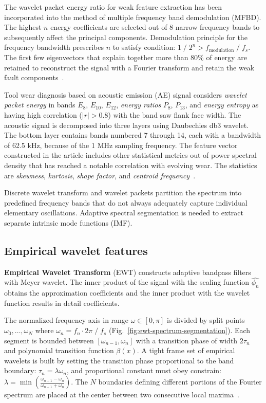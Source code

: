 The wavelet packet energy ratio for weak feature extraction has been incorporated into the method of multiple frequency band demodulation (MFBD). The highest $n$ energy coefficients are selected out of 8 narrow frequency bands to subsequently affect the principal components. Demodulation principle for the frequency bandwidth prescribes $n$ to satisfy condition: $1\;/\;2^n > f_{\mathrm{modulation}}\;/\;f_s$. The first few eigenvectors that explain together more than 80\% of energy are retained to reconstruct the signal with a Fourier transform and retain the weak fault components~\cite{song_mfbd_2021}.

Tool wear diagnosis based on acoustic emission (AE) signal considers \emph{wavelet packet energy} in bands $E_{8}$, $E_{10}$, $E_{12}$, \emph{energy ratios} $P_{8}$, $P_{13}$, and \emph{energy entropy} as having high correlation ($|r| > 0.8$) with the band saw flank face width. The acoustic signal is decomposed into three layers using Daubechies db3 wavelet. The bottom layer contains bands numbered 7 through 14, each with a bandwidth of 62.5 kHz, because of the 1 MHz sampling frequency. The feature vector constructed in the article includes other statistical metrics out of power spectral density that has reached a notable correlation with evolving wear. The statistics are \emph{skewness}, \emph{kurtosis}, \emph{shape factor}, and \emph{centroid frequency}~\cite{zhuo_research_2022}.

Discrete wavelet transform and wavelet packets partition the spectrum into predefined frequency bands that do not always adequately capture individual elementary oscillations. Adaptive spectral segmentation is needed to extract separate intrinsic mode functions (IMF).

\subsection{Empirical wavelet features}
\textbf{Empirical Wavelet Transform} (EWT) constructs adaptive bandpass filters with Meyer wavelet. The inner product of the signal with the scaling function $\hat{\phi_n}$ obtains the approximation coefficients and the inner product with the wavelet function results in detail coefficients.

The normalized frequency axis in range $\omega \in [0, \pi]$ is divided by split points $\omega_0, \dots, \omega_N$ where $\omega_n = f_n \cdot 2 \pi\;/\;f_s$ (Fig.~\ref{fig:ewt-spectrum-segmentation}). Each segment is bounded between $[\omega_{n-1}, \omega_n]$ with a transition phase of width $2\tau_n$ and polynomial transition function $\beta(x)$. A tight frame set of empirical wavelets is built by setting the transition phase proportional to the band boundary: $\tau_n = \lambda \omega_n$, and proportional constant must obey constrain: $\lambda = \min\left(\frac{\omega_{n+1} - \omega_n}{\omega_{n+1} + \omega_n}\right)$. The $N$ boundaries defining different portions of the Fourier spectrum are placed at the center between two consecutive local maxima~\cite{gilles_empirical_2013}.

